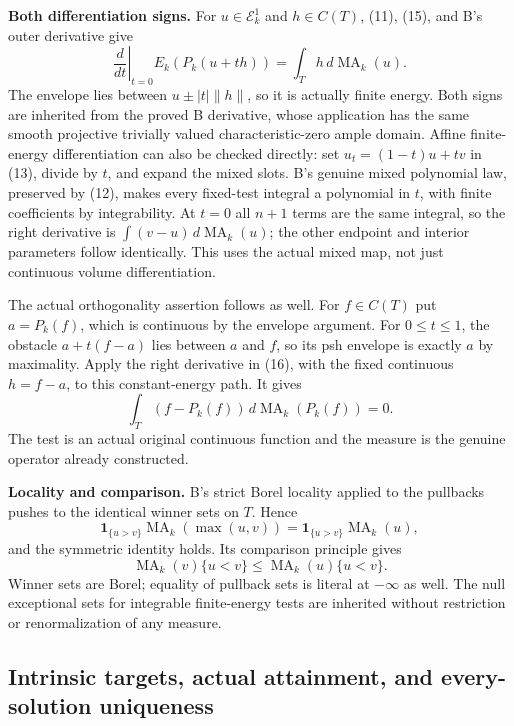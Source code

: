 \documentclass[
  11pt,
]{article}
\begin{document}
\textbf{Both differentiation signs.} For \(u\in\mathcal E^1_k\) and
\(h\in C(T)\), (11), (15), and B's outer derivative give \[
 \left.\frac d{dt}\right|_{t=0}E_k(P_k(u+th))
       =\int_T h\,d\operatorname{MA}_k(u).
 \tag{16}
\] The envelope lies between \(u\pm |t|\|h\|\), so it is actually finite
energy. Both signs are inherited from the proved B derivative, whose
application has the same smooth projective trivially valued
characteristic-zero ample domain. Affine finite-energy differentiation
can also be checked directly: set \(u_t=(1-t)u+tv\) in (13), divide by
\(t\), and expand the mixed slots. B's genuine mixed polynomial law,
preserved by (12), makes every fixed-test integral a polynomial in
\(t\), with finite coefficients by integrability. At \(t=0\) all \(n+1\)
terms are the same integral, so the right derivative is
\(\int(v-u)\,d\operatorname{MA}_k(u)\); the other endpoint and interior
parameters follow identically. This uses the actual mixed map, not just
continuous volume differentiation.

The actual orthogonality assertion follows as well. For \(f\in C(T)\)
put \(a=P_k(f)\), which is continuous by the envelope argument. For
\(0\leq t\leq1\), the obstacle \(a+t(f-a)\) lies between \(a\) and
\(f\), so its psh envelope is exactly \(a\) by maximality. Apply the
right derivative in (16), with the fixed continuous \(h=f-a\), to this
constant-energy path. It gives \[
 \int_T(f-P_k(f))\,d\operatorname{MA}_k(P_k(f))=0.
\] The test is an actual original continuous function and the measure is
the genuine operator already constructed.

\textbf{Locality and comparison.} B's strict Borel locality applied to
the pullbacks pushes to the identical winner sets on \(T\). Hence \[
 \mathbf1_{\{u>v\}}\operatorname{MA}_k(\max(u,v))
       =\mathbf1_{\{u>v\}}\operatorname{MA}_k(u),
\] and the symmetric identity holds. Its comparison principle gives \[
 \operatorname{MA}_k(v)\{u<v\}\leq
       \operatorname{MA}_k(u)\{u<v\}.
 \tag{17}
\] Winner sets are Borel; equality of pullback sets is literal at
\(-\infty\) as well. The null exceptional sets for integrable
finite-energy tests are inherited without restriction or renormalization
of any measure.

\subsection{Intrinsic targets, actual attainment, and every-solution
uniqueness}\label{intrinsic-targets-actual-attainment-and-every-solution-uniqueness}
\end{document}

